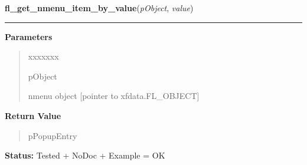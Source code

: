 \hspace{.8\funcindent}\begin{boxedminipage}{\funcwidth}

    \raggedright \textbf{fl\_get\_nmenu\_item\_by\_value}(\textit{pObject}, \textit{value})

    \vspace{-1.5ex}

    \rule{\textwidth}{0.5\fboxrule}
\setlength{\parskip}{2ex}
\setlength{\parskip}{1ex}
      \textbf{Parameters}
      \vspace{-1ex}

      \begin{quote}
        \begin{Ventry}{xxxxxxx}

          \item[pObject]

          nmenu object [pointer to xfdata.FL\_OBJECT]

        \end{Ventry}

      \end{quote}

      \textbf{Return Value}
    \vspace{-1ex}

      \begin{quote}
      pPopupEntry

      \end{quote}

\textbf{Status:} Tested + NoDoc + Example = OK



    \end{boxedminipage}

    \label{xformslib:library:fl_get_nmenu_item_by_label}

    \vspace{0.5ex}


